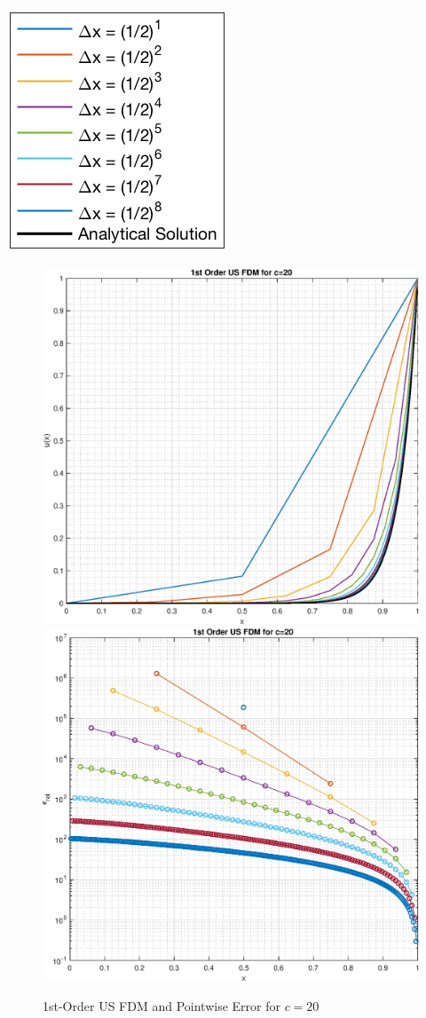 \documentclass[10pt, reqno]{article}		%
\numberwithin{equation}{section}
\begin{document}
\begin{center}
	\includegraphics[height = 0.25\linewidth]{legend}
\end{center}

\newpage

\begin{figure}[H]
	\begin{center}
		\includegraphics[width = 0.49\linewidth]{solution_1st_order_us_c_20}
		\includegraphics[width = 0.49\linewidth]{pointwise_error_1st_order_us_c_20}
		\caption{1st-Order US FDM and Pointwise Error for $c = 20$}
	\end{center}
\end{figure}
\end{document}
